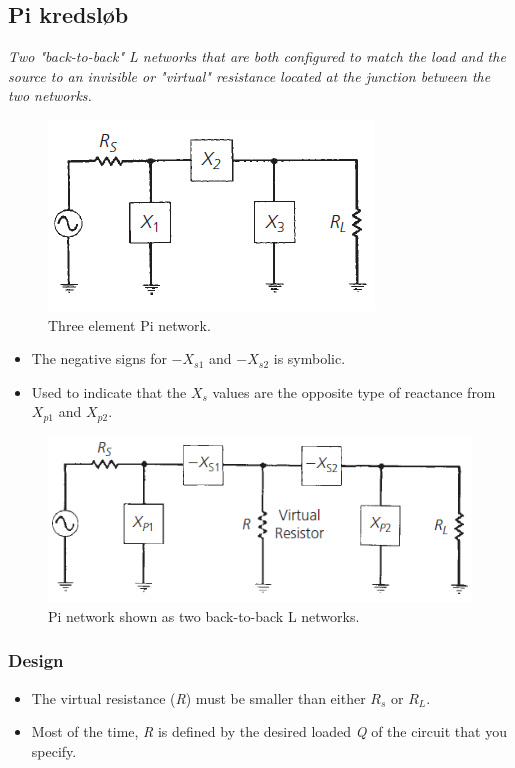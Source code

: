 \subsection{Pi kredsløb}
\textit{Two "back-to-back" L networks that are both configured to match the load and
	the source to an invisible or "virtual" resistance located at the junction between the two networks.}

\begin{figure} [H]
	\centering
	\includegraphics[width=0.6\linewidth]{graphics/27.png}
	\caption{Three element Pi network.}
	\label{fig:27}
\end{figure}

\begin{itemize}
	\item The negative signs for $-X_{s1}$ and $-X_{s2}$ is symbolic.
	\item Used to indicate that the $X_s$ values are the opposite type of reactance from $X_{p1}$ and $X_{p2}$.
\end{itemize}

\begin{figure} [H]
	\centering
	\includegraphics[width=0.8\linewidth]{graphics/29.png}
	\caption{Pi network shown as two back-to-back L networks.}
	\label{fig:29}
\end{figure}

\subsubsection{Design}
\begin{itemize}
	\item The virtual resistance (\textit{R}) must be smaller than either $R_s$ or $R_L$.
	\item Most of the time, \textit{R} is defined by the desired loaded \textit{Q} of the
	circuit that you specify.
\end{itemize}

